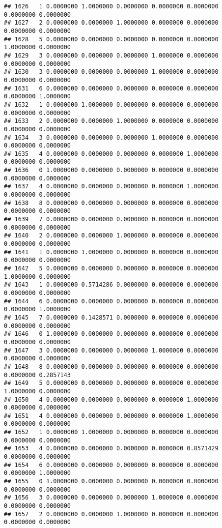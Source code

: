 \documentclass[
]{article}
\begin{document}
\begin{verbatim}
## 1626   1 0.0000000 1.0000000 0.0000000 0.0000000 0.0000000 0.0000000 0.0000000
## 1627   2 0.0000000 0.0000000 1.0000000 0.0000000 0.0000000 0.0000000 0.0000000
## 1628   5 0.0000000 0.0000000 0.0000000 0.0000000 0.0000000 1.0000000 0.0000000
## 1629   3 0.0000000 0.0000000 0.0000000 1.0000000 0.0000000 0.0000000 0.0000000
## 1630   3 0.0000000 0.0000000 0.0000000 1.0000000 0.0000000 0.0000000 0.0000000
## 1631   6 0.0000000 0.0000000 0.0000000 0.0000000 0.0000000 0.0000000 1.0000000
## 1632   1 0.0000000 1.0000000 0.0000000 0.0000000 0.0000000 0.0000000 0.0000000
## 1633   2 0.0000000 0.0000000 1.0000000 0.0000000 0.0000000 0.0000000 0.0000000
## 1634   3 0.0000000 0.0000000 0.0000000 1.0000000 0.0000000 0.0000000 0.0000000
## 1635   4 0.0000000 0.0000000 0.0000000 0.0000000 1.0000000 0.0000000 0.0000000
## 1636   0 1.0000000 0.0000000 0.0000000 0.0000000 0.0000000 0.0000000 0.0000000
## 1637   4 0.0000000 0.0000000 0.0000000 0.0000000 1.0000000 0.0000000 0.0000000
## 1638   8 0.0000000 0.0000000 0.0000000 0.0000000 0.0000000 0.0000000 0.0000000
## 1639   7 0.0000000 0.0000000 0.0000000 0.0000000 0.0000000 0.0000000 0.0000000
## 1640   2 0.0000000 0.0000000 1.0000000 0.0000000 0.0000000 0.0000000 0.0000000
## 1641   1 0.0000000 1.0000000 0.0000000 0.0000000 0.0000000 0.0000000 0.0000000
## 1642   5 0.0000000 0.0000000 0.0000000 0.0000000 0.0000000 1.0000000 0.0000000
## 1643   1 0.0000000 0.5714286 0.0000000 0.0000000 0.0000000 0.0000000 0.0000000
## 1644   6 0.0000000 0.0000000 0.0000000 0.0000000 0.0000000 0.0000000 1.0000000
## 1645   7 0.0000000 0.1428571 0.0000000 0.0000000 0.0000000 0.0000000 0.0000000
## 1646   0 1.0000000 0.0000000 0.0000000 0.0000000 0.0000000 0.0000000 0.0000000
## 1647   3 0.0000000 0.0000000 0.0000000 1.0000000 0.0000000 0.0000000 0.0000000
## 1648   8 0.0000000 0.0000000 0.0000000 0.0000000 0.0000000 0.0000000 0.2857143
## 1649   5 0.0000000 0.0000000 0.0000000 0.0000000 0.0000000 1.0000000 0.0000000
## 1650   4 0.0000000 0.0000000 0.0000000 0.0000000 1.0000000 0.0000000 0.0000000
## 1651   4 0.0000000 0.0000000 0.0000000 0.0000000 1.0000000 0.0000000 0.0000000
## 1652   1 0.0000000 1.0000000 0.0000000 0.0000000 0.0000000 0.0000000 0.0000000
## 1653   4 0.0000000 0.0000000 0.0000000 0.0000000 0.8571429 0.0000000 0.0000000
## 1654   6 0.0000000 0.0000000 0.0000000 0.0000000 0.0000000 0.0000000 1.0000000
## 1655   0 1.0000000 0.0000000 0.0000000 0.0000000 0.0000000 0.0000000 0.0000000
## 1656   3 0.0000000 0.0000000 0.0000000 1.0000000 0.0000000 0.0000000 0.0000000
## 1657   2 0.0000000 0.0000000 1.0000000 0.0000000 0.0000000 0.0000000 0.0000000

\end{verbatim}
\end{document}
